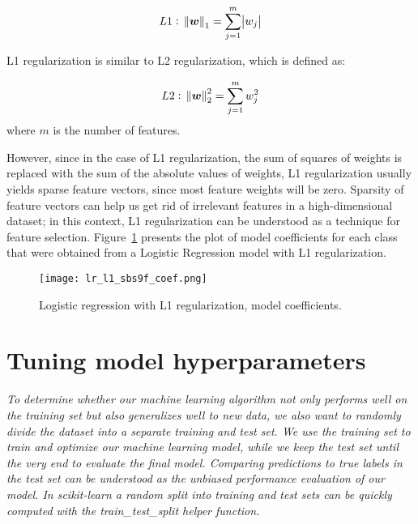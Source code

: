\begin{equation} \label{eq:l1_regularization}
    L1:~\norm{\boldsymbol{w}}_1 = \sum \limits_{j=1}^m \abs{w_j}
\end{equation}

L1 regularization is similar to L2 regularization, which is defined as:

\begin{equation} \label{eq:l2_regularization}
    L2:~\norm{\boldsymbol{w}}_2^2 = \sum \limits_{j=1}^m w_j^2
\end{equation}
where $m$ is the number of features.

However, since in the case of L1 regularization, the sum of squares of weights is replaced with the sum of the absolute values of weights, L1 regularization usually yields sparse feature vectors, since most feature weights will be zero\cite{RaschkaMirjalili2017,Scikit-learndevelopers2019}.
Sparsity of feature vectors can help us get rid of irrelevant features in a high-dimensional dataset;
in this context, L1 regularization can be understood as a technique for feature selection\cite{RaschkaMirjalili2017}.
Figure~\ref{fig:lr_l1_sbs9f_coef} presents the plot of model coefficients for each class that were obtained from a Logistic Regression model with L1 regularization.

\begin{figure}[hbt!]
    \centering
    \texttt{[image: lr\_l1\_sbs9f\_coef.png]}
    \caption{Logistic regression with L1 regularization, model coefficients.}
    \label{fig:lr_l1_sbs9f_coef}
\end{figure}

\section{Tuning model hyperparameters} \label{sec:tuning_hyperparameters}

\textit{To determine whether our machine learning algorithm not only performs well on the training set but also generalizes well to new data, we also want to randomly divide the dataset into a separate training and test set. We use the training set to train and optimize our machine learning model, while we keep the test set until the very end to evaluate the final model. Comparing predictions to true labels in the test set can be understood as the unbiased performance evaluation of our model. In scikit-learn a random split into training and test sets can be quickly computed with the train\_test\_split helper function.}\cite{RaschkaMirjalili2017}

